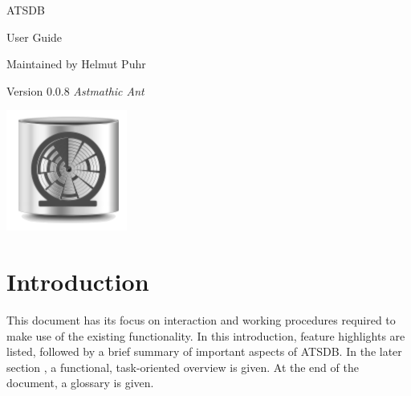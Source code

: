 \documentclass[10pt,letterpaper,extrafontsizes]{memoir}
\begin{document}
\firmlists
\midsloppy
\raggedbottom
{}




\frontmatter
\pagestyle{empty}


\vspace*{\fill}
\begin{center}
\HUGE\textsf{ATSDB}\par
\end{center}

\begin{center}
\Huge\textsf{User Guide}\par
\end{center}
\begin{center}
\normalsize\textsf{Maintained by Helmut Puhr}\par
\medskip
\normalsize\textsf{Version 0.0.8 \textit{Astmathic Ant}}\par
\end{center}
\vspace*{\fill}
\begin{center}
\includegraphics[width=\droptitle]{../logo/atsdb.png}
\setlength{\droptitle}{0pt}%
\end{center}
\clearpage

\cleardoublepage

\pagestyle{headings}

\setupshorttoc
\tableofcontents
\clearpage
\setupparasubsecs
\setupmaintoc
\tableofcontents
\setlength{\unitlength}{1pt}
\clearpage
\listoffigures
\clearpage
\listoftables


\chapter{Introduction}

This document has its focus on interaction and working procedures required to make use of the existing
functionality. In this introduction, feature highlights are listed, followed by a brief summary of important aspects of  ATSDB. In the later section , a functional, task-oriented overview is given. At the end of the document, a glossary is given.
\end{document}
